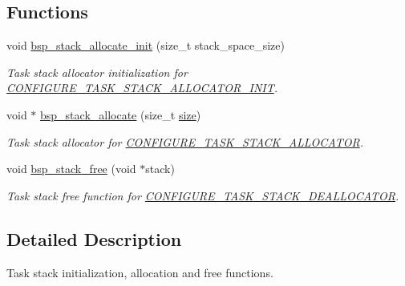 \subsection*{Functions}
\begin{DoxyCompactItemize}
\item 
\mbox{\label{group__bsp__stack_ga5525bfd94b2a806da939383fe0c2fde1}} 
void \mbox{\hyperlink{group__bsp__stack_ga5525bfd94b2a806da939383fe0c2fde1}{bsp\+\_\+stack\+\_\+allocate\+\_\+init}} (size\+\_\+t stack\+\_\+space\+\_\+size)
\begin{DoxyCompactList}\small\item\em Task stack allocator initialization for \mbox{\hyperlink{group__bsp__stack_ga6b97dad0691514ec4f93cfec0a35d791}{C\+O\+N\+F\+I\+G\+U\+R\+E\+\_\+\+T\+A\+S\+K\+\_\+\+S\+T\+A\+C\+K\+\_\+\+A\+L\+L\+O\+C\+A\+T\+O\+R\+\_\+\+I\+N\+IT}}. \end{DoxyCompactList}\item 
void $\ast$ \mbox{\hyperlink{group__bsp__stack_ga223d4cdc3855e573987ecc66ddb9dacd}{bsp\+\_\+stack\+\_\+allocate}} (size\+\_\+t \mbox{\hyperlink{sun4u_2tte_8h_a245260f6f74972558f61b85227df5aae}{size}})
\begin{DoxyCompactList}\small\item\em Task stack allocator for \mbox{\hyperlink{group__bsp__stack_ga78aadbd6dc37d63e9a973832e76ef07b}{C\+O\+N\+F\+I\+G\+U\+R\+E\+\_\+\+T\+A\+S\+K\+\_\+\+S\+T\+A\+C\+K\+\_\+\+A\+L\+L\+O\+C\+A\+T\+OR}}. \end{DoxyCompactList}\item 
\mbox{\label{group__bsp__stack_ga6c8e965e98b6bd63769dd9679dd9afa5}} 
void \mbox{\hyperlink{group__bsp__stack_ga6c8e965e98b6bd63769dd9679dd9afa5}{bsp\+\_\+stack\+\_\+free}} (void $\ast$stack)
\begin{DoxyCompactList}\small\item\em Task stack free function for \mbox{\hyperlink{group__bsp__stack_gad4b9c3c1b05e7ee120b8bc5782970cd0}{C\+O\+N\+F\+I\+G\+U\+R\+E\+\_\+\+T\+A\+S\+K\+\_\+\+S\+T\+A\+C\+K\+\_\+\+D\+E\+A\+L\+L\+O\+C\+A\+T\+OR}}. \end{DoxyCompactList}\end{DoxyCompactItemize}


\subsection{Detailed Description}
Task stack initialization, allocation and free functions. 

